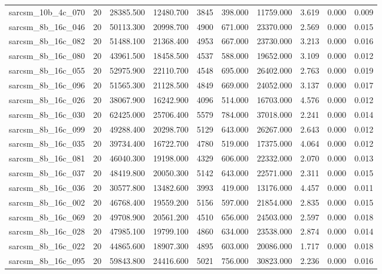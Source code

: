 \begin{tabular}{lrrrrrrrrr}
sarcsm\_10b\_4c\_070 & 20 & 28385.500 & 12480.700 & 3845 & 398.000 & 11759.000 & 3.619 & 0.000 & 0.009 \\
sarcsm\_8b\_16c\_046 & 20 & 50113.300 & 20998.700 & 4900 & 671.000 & 23370.000 & 2.569 & 0.000 & 0.015 \\
sarcsm\_8b\_16c\_082 & 20 & 51488.100 & 21368.400 & 4953 & 667.000 & 23730.000 & 3.213 & 0.000 & 0.016 \\
sarcsm\_8b\_16c\_080 & 20 & 43961.500 & 18458.500 & 4537 & 588.000 & 19652.000 & 3.109 & 0.000 & 0.012 \\
sarcsm\_8b\_16c\_055 & 20 & 52975.900 & 22110.700 & 4548 & 695.000 & 26402.000 & 2.763 & 0.000 & 0.019 \\
sarcsm\_8b\_16c\_096 & 20 & 51565.300 & 21128.500 & 4849 & 669.000 & 24052.000 & 3.137 & 0.000 & 0.017 \\
sarcsm\_8b\_16c\_026 & 20 & 38067.900 & 16242.900 & 4096 & 514.000 & 16703.000 & 4.576 & 0.000 & 0.012 \\
sarcsm\_8b\_16c\_030 & 20 & 62425.000 & 25706.400 & 5579 & 784.000 & 37018.000 & 2.241 & 0.000 & 0.014 \\
sarcsm\_8b\_16c\_099 & 20 & 49288.400 & 20298.700 & 5129 & 643.000 & 26267.000 & 2.643 & 0.000 & 0.012 \\
sarcsm\_8b\_16c\_035 & 20 & 39734.400 & 16722.700 & 4780 & 519.000 & 17375.000 & 4.064 & 0.000 & 0.012 \\
sarcsm\_8b\_16c\_081 & 20 & 46040.300 & 19198.000 & 4329 & 606.000 & 22332.000 & 2.070 & 0.000 & 0.013 \\
sarcsm\_8b\_16c\_037 & 20 & 48419.800 & 20050.300 & 5142 & 643.000 & 22571.000 & 2.311 & 0.000 & 0.015 \\
sarcsm\_8b\_16c\_036 & 20 & 30577.800 & 13482.600 & 3993 & 419.000 & 13176.000 & 4.457 & 0.000 & 0.011 \\
sarcsm\_8b\_16c\_002 & 20 & 46768.400 & 19559.200 & 5156 & 597.000 & 21854.000 & 2.835 & 0.000 & 0.015 \\
sarcsm\_8b\_16c\_069 & 20 & 49708.900 & 20561.200 & 4510 & 656.000 & 24503.000 & 2.597 & 0.000 & 0.018 \\
sarcsm\_8b\_16c\_028 & 20 & 47985.100 & 19799.100 & 4860 & 634.000 & 23538.000 & 2.874 & 0.000 & 0.014 \\
sarcsm\_8b\_16c\_022 & 20 & 44865.600 & 18907.300 & 4895 & 603.000 & 20086.000 & 1.717 & 0.000 & 0.018 \\
sarcsm\_8b\_16c\_095 & 20 & 59843.800 & 24416.600 & 5021 & 756.000 & 30823.000 & 2.236 & 0.000 & 0.016 \\

\end{tabular}
